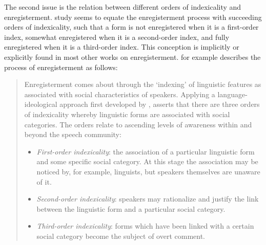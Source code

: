 The second issue is the relation between different orders of indexicality and enregisterment.  study seems to equate the enregisterment process with succeeding orders of indexicality, such that a form is not enregistered when it is a first-order index, somewhat enregistered when it is a second-order index, and fully enregistered when it is a third-order index. This conception is implicitly or explicitly found in most other works on enregisterment. \citet[137--138]{Beal2012} for example describes the process of enregisterment as follows:

\begin{quote}
Enregisterment comes about through the ‘indexing’ of linguistic features as associated with social characteristics of speakers. Applying a language-ideological approach first developed by \citet{Silverstein1976, Silverstein1998}, \citet{Milroy2000, Milroy2004} asserts that there are three orders of indexicality whereby linguistic forms are associated with social categories. The orders relate to ascending levels of awareness within and beyond the speech community:
\begin{itemize}
\item 
\emph{First-order indexicality}: the association of a particular linguistic form and some specific social category. At this stage the association may be noticed by, for example, linguists, but speakers themselves are unaware of it.
\item 
\emph{Second-order indexicality}: speakers may rationalize and justify the link between the linguistic form and a particular social category.
\item
\emph{Third-order indexicality}: forms which have been linked with a certain social category become the subject of overt comment.
\end{itemize}
\end{quote}


